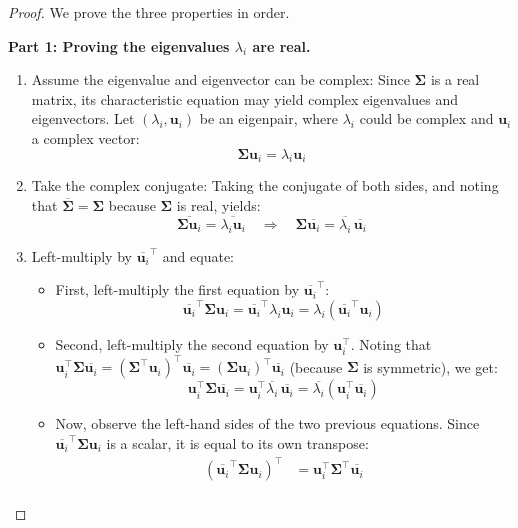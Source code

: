 \documentclass[../main.tex]{subfiles}
\begin{document}
\begin{proof}
We prove the three properties in order.

\noindent\textbf{Part 1: Proving the eigenvalues $\lambda_i$ are real.}
\begin{enumerate}
    \item Assume the eigenvalue and eigenvector can be complex: Since $\boldsymbol{\Sigma}$ is a real matrix, its characteristic equation may yield complex eigenvalues and eigenvectors. Let $(\lambda_i, \mathbf{u}_i)$ be an eigenpair, where $\lambda_i$ could be complex and $\mathbf{u}_i$ a complex vector:
    $$
    \boldsymbol{\Sigma} \mathbf{u}_i = \lambda_i \mathbf{u}_i
    $$
    \item Take the complex conjugate: Taking the conjugate of both sides, and noting that $\overline{\boldsymbol{\Sigma}} = \boldsymbol{\Sigma}$ because $\boldsymbol{\Sigma}$ is real, yields:
    $$
    \overline{\boldsymbol{\Sigma} \mathbf{u}_i} = \overline{\lambda_i \mathbf{u}_i} \quad \Rightarrow \quad \boldsymbol{\Sigma} \overline{\mathbf{u}_i} = \overline{\lambda_i} \, \overline{\mathbf{u}_i}
    $$
    \item Left-multiply by $\overline{\mathbf{u}_i}^\top$ and equate:
    \begin{itemize}
        \item First, left-multiply the first equation by $\overline{\mathbf{u}_i}^\top$:
        $$
        \overline{\mathbf{u}_i}^\top \boldsymbol{\Sigma} \mathbf{u}_i = \overline{\mathbf{u}_i}^\top \lambda_i \mathbf{u}_i = \lambda_i (\overline{\mathbf{u}_i}^\top \mathbf{u}_i)
        $$
        \item Second, left-multiply the second equation by $\mathbf{u}_i^\top$. Noting that $\mathbf{u}_i^\top \boldsymbol{\Sigma} \overline{\mathbf{u}_i} = (\boldsymbol{\Sigma}^\top \mathbf{u}_i)^\top \overline{\mathbf{u}_i} = (\boldsymbol{\Sigma} \mathbf{u}_i)^\top \overline{\mathbf{u}_i}$ (because $\boldsymbol{\Sigma}$ is symmetric), we get:
        $$
        \mathbf{u}_i^\top \boldsymbol{\Sigma} \overline{\mathbf{u}_i} = \mathbf{u}_i^\top \overline{\lambda_i} \, \overline{\mathbf{u}_i} = \overline{\lambda_i} (\mathbf{u}_i^\top \overline{\mathbf{u}_i})
        $$
        \item Now, observe the left-hand sides of the two previous equations. Since $\overline{\mathbf{u}_i}^\top \boldsymbol{\Sigma} \mathbf{u}_i$ is a scalar, it is equal to its own transpose:
        \begin{align*}
        (\overline{\mathbf{u}_i}^\top \boldsymbol{\Sigma} \mathbf{u}_i)^\top &= \mathbf{u}_i^\top \boldsymbol{\Sigma}^\top \overline{\mathbf{u}_i} \\

\end{align*}
\end{itemize}
\end{enumerate}
\end{proof}
\end{document}
